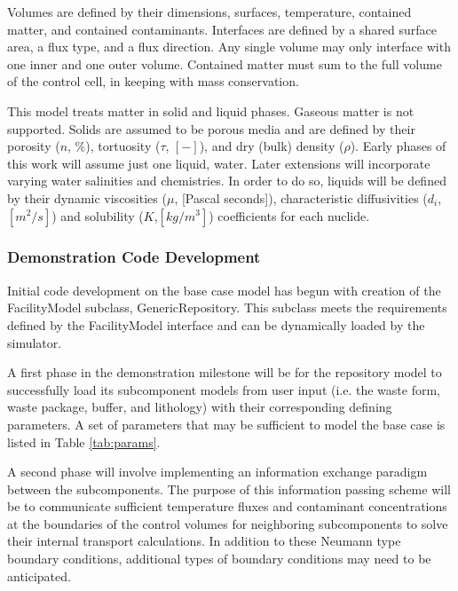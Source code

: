 Volumes are defined by their dimensions, surfaces, temperature, contained
matter, and contained contaminants.  Interfaces are defined by a shared 
surface area, a flux type, and a flux direction. Any single volume may only 
interface with one inner and one outer volume. Contained matter must sum 
to the full volume of the control cell, in keeping with mass conservation.

This model treats matter in solid and liquid phases. Gaseous matter is not 
supported. 
Solids are assumed to be porous media and are defined by their porosity 
($n$, $\%$), tortuosity ($\tau$, $[-]$), and dry (bulk) density ($\rho$). 
Early phases of this work will assume just one liquid, water. Later 
extensions will incorporate varying water salinities and chemistries. 
In order to do so, liquids will be defined by their dynamic viscosities ($\mu$, 
[Pascal seconds]), characteristic diffusivities ($d_i$, $[m^2/s]$) and 
solubility ($K$,$[kg/m^3]$) coefficients for each nuclide.

\subsubsection{Demonstration Code Development}

    
  Initial code development on the base case model has begun with creation of the 
  FacilityModel subclass, GenericRepository. This subclass meets the 
  requirements defined by the \Cyclus FacilityModel interface and can be 
  dynamically loaded by the simulator. 

  A first phase in the demonstration milestone will be for the repository model 
  to successfully load its subcomponent models from user input (i.e. the 
  waste form, waste package, buffer, and lithology) with their corresponding 
  defining parameters. A set of parameters that may be sufficient to model the 
  base case is listed in Table \ref{tab:params}.

  

  A second phase will involve implementing an information exchange paradigm 
  between the subcomponents. The purpose of this information passing scheme will  
  be to communicate sufficient temperature fluxes and contaminant concentrations 
  at the boundaries of the control volumes for neighboring subcomponents to  solve 
  their internal transport calculations.  In addition to these Neumann type 
  boundary conditions, additional types of boundary conditions may need to be 
  anticipated.

